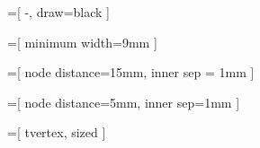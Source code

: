 

\newcommand{\dfopt}[3]{
    ~\\
    \hrule
    \begin{npb}
        #1
        \begin{itemize}
            \itemindent 5mm
            \item[\textbf{Données :}] #2
            \item[\textbf{Résultat :}] #3
        \end{itemize}
    \end{npb}
    \hrule
    ~\\
}

\newcommand{\dfpb}[3]{
    ~\\
    \hrule
    \begin{npb}
        #1
        \begin{itemize}
            \itemindent 10mm
            \item[\textbf{Données :}] #2
            \item[\textbf{Question :}] #3
        \end{itemize}
    \end{npb}
    \hrule
    ~\\
}

\newcommand{\dfpbp}[4]{
    ~\\
    \hrule
    \begin{npb}
        #1
        \begin{itemize}
            \itemindent 10mm
            \item[\textbf{Données :}] #2
            \item[\textbf{Paramètre :}] #4
            \item[\textbf{Question :}] #3
        \end{itemize}
    \end{npb}
    \hrule
    ~\\
}

    
=[
	-,
	draw=black
]

=[
    minimum width=9mm
]

=[
	node distance=15mm,
    inner sep = 1mm
]

=[
	node distance=5mm,
    inner sep=1mm
]

=[
    tvertex,
    sized
]

